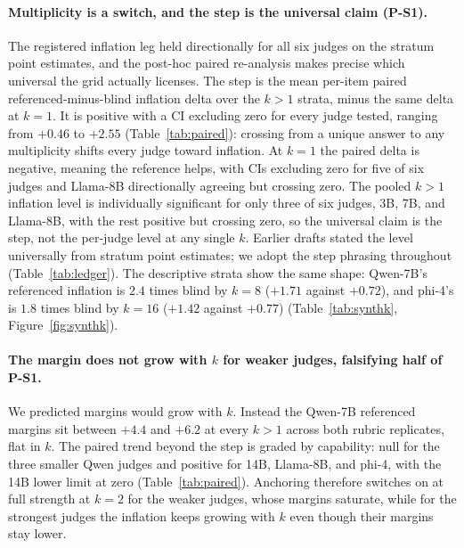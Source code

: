 \documentclass[11pt]{article}
\begin{document}
\paragraph{Multiplicity is a switch, and the step is the universal claim (P-S1).}
The registered inflation leg held directionally for all six judges on the stratum point estimates, and the post-hoc paired re-analysis makes precise which universal the grid actually licenses.
The step is the mean per-item paired referenced-minus-blind inflation delta over the $k > 1$ strata, minus the same delta at $k{=}1$.
It is positive with a CI excluding zero for every judge tested, ranging from $+0.46$ to $+2.55$ (Table~\ref{tab:paired}): crossing from a unique answer to any multiplicity shifts every judge toward inflation.
At $k{=}1$ the paired delta is negative, meaning the reference helps, with CIs excluding zero for five of six judges and Llama-8B directionally agreeing but crossing zero.
The pooled $k > 1$ inflation level is individually significant for only three of six judges, 3B, 7B, and Llama-8B, with the rest positive but crossing zero, so the universal claim is the step, not the per-judge level at any single $k$.
Earlier drafts stated the level universally from stratum point estimates; we adopt the step phrasing throughout (Table~\ref{tab:ledger}).
The descriptive strata show the same shape: Qwen-7B's referenced inflation is $2.4$ times blind by $k{=}8$ ($+1.71$ against $+0.72$), and phi-4's is $1.8$ times blind by $k{=}16$ ($+1.42$ against $+0.77$) (Table~\ref{tab:synthk}, Figure~\ref{fig:synthk}).

\paragraph{The margin does not grow with $k$ for weaker judges, falsifying half of P-S1.}
We predicted margins would grow with $k$.
Instead the Qwen-7B referenced margins sit between $+4.4$ and $+6.2$ at every $k > 1$ across both rubric replicates, flat in $k$.
The paired trend beyond the step is graded by capability: null for the three smaller Qwen judges and positive for 14B, Llama-8B, and phi-4, with the 14B lower limit at zero (Table~\ref{tab:paired}).
Anchoring therefore switches on at full strength at $k{=}2$ for the weaker judges, whose margins saturate, while for the strongest judges the inflation keeps growing with $k$ even though their margins stay lower.
\end{document}
